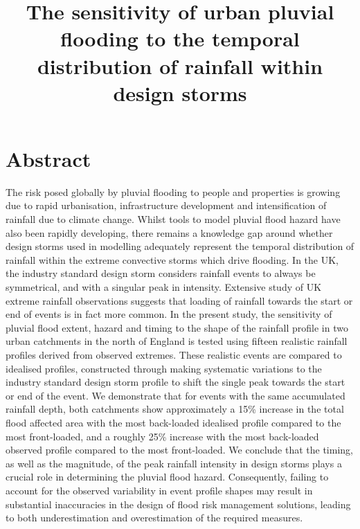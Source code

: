 \documentclass[APA,Times2COL]{WileyNJDv5}
\title{\textbf{The sensitivity of urban pluvial flooding to the temporal distribution of rainfall within design storms}}
\date{}
\begin{document}
\maketitle
\vspace{-1.5cm}

\section{Abstract}


The risk posed globally by pluvial flooding to people and properties is growing due to rapid urbanisation, infrastructure development and intensification of rainfall due to climate change. Whilst tools to model pluvial flood hazard have also been rapidly developing, there remains a knowledge gap around whether design storms used in modelling adequately represent the temporal distribution of rainfall within the extreme convective storms which drive flooding.  In the UK, the industry standard design storm considers rainfall events to always be symmetrical, and with a singular peak in intensity. Extensive study of UK extreme rainfall observations suggests that loading of rainfall towards the start or end of events is in fact more common. In the present study, the sensitivity of pluvial flood extent, hazard and timing to the shape of the rainfall profile in two urban catchments in the north of England is tested using fifteen realistic rainfall profiles derived from observed extremes. These realistic events are compared to idealised profiles, constructed through making systematic variations to the industry standard design storm profile to shift the single peak towards the start or end of the event. We demonstrate that for events with the same accumulated rainfall depth, both catchments show approximately a 15\% increase in the total flood affected area with the most back-loaded idealised profile compared to the most front-loaded, and a roughly 25\% increase with the most back-loaded observed profile compared to the most front-loaded. We conclude that the timing, as well as the magnitude, of the peak rainfall intensity in design storms plays a crucial role in determining the pluvial flood hazard. Consequently, failing to account for the observed variability in event profile shapes may result in substantial inaccuracies in the design of flood risk management solutions, leading to both underestimation and overestimation of the required measures. 
\end{document}
